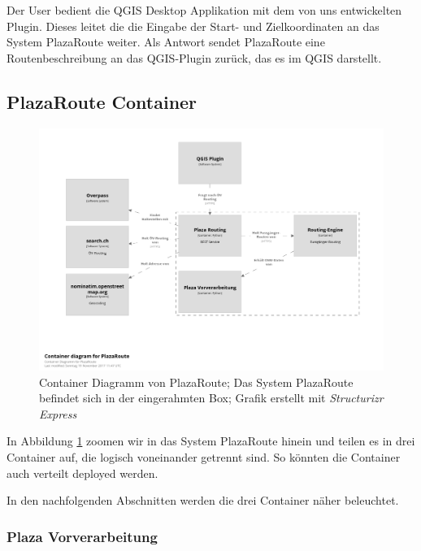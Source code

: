 Der User bedient die QGIS Desktop Applikation mit dem von uns entwickelten Plugin. Dieses leitet die die Eingabe der Start- und Zielkoordinaten an das System PlazaRoute weiter. Als Antwort sendet PlazaRoute eine Routenbeschreibung an das QGIS-Plugin zurück, das es im QGIS darstellt.

\subsection{PlazaRoute Container}
\label{architektur:PlazaRoute Container}

\begin{figure}[ht]
    \centering
    \includegraphics[width=1\linewidth]{projectdoc/img/container_diagram.png}
    \caption[Container Diagramm]{Container Diagramm von PlazaRoute; Das System PlazaRoute befindet sich in der eingerahmten Box; Grafik erstellt mit \emph{Structurizr Express}\cite{structurizr}}
    \label{fig:container_diagram}
    \end{figure}

In Abbildung \ref{fig:container_diagram} zoomen wir in das System PlazaRoute hinein und teilen es in drei Container auf, die logisch voneinander getrennt sind. So könnten die Container auch verteilt deployed werden.

In den nachfolgenden Abschnitten werden die drei Container näher beleuchtet.


\subsubsection{Plaza Vorverarbeitung}
\label{architektur:Plaza Vorverarbeitung}

